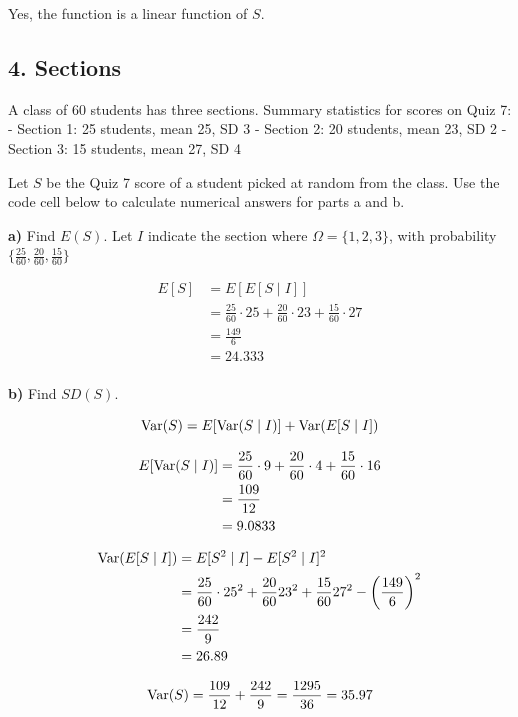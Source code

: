 \documentclass[11pt]{article}
\begin{document}
Yes, the function is a linear function of $S$.
    \newpage

    \hypertarget{sections}{%
\subsection{4. Sections}\label{sections}}

A class of 60 students has three sections. Summary statistics for scores
on Quiz 7: - Section 1: 25 students, mean 25, SD 3 - Section 2: 20
students, mean 23, SD 2 - Section 3: 15 students, mean 27, SD 4

Let \(S\) be the Quiz 7 score of a student picked at random from the
class. Use the code cell below to calculate numerical answers for parts
a and b.

\textbf{a)} Find \(E(S)\).
Let $I$ indicate the section where $\Omega = \{1,2,3\}$, with probability $\{\frac{25}{60}, \frac{20}{60}, \frac{15}{60}\}$ 


\begin{align*}
	E[S] &= E[E[S \mid I]] \\ 
	&= \frac{25}{60} \cdot 25 + \frac{20}{60} \cdot 23 + \frac{15}{60} \cdot 27 \\
	&= \frac{149}{6} \\
	&= 24.333 \\
\end{align*}


\textbf{b)} Find \(SD(S)\).

\[
	\operatorname{Var}(S) = E[\operatorname{Var}(S \mid I)] + \operatorname{Var}(E[S \mid I]) \\
\]

\begin{align*}
	E[\operatorname{Var}(S \mid I)] &= \frac{25}{60} \cdot 9 + \frac{20}{60} \cdot 4 + \frac{15}{60} \cdot 16 \\
	&= \frac{109}{12} \\
	&= 9.0833 \\
\end{align*} 

\begin{align*}
	\operatorname{Var}(E[S \mid I]) &= E[S^{2} \mid I] - E[S^{2} \mid I]^{2} \\
	&= \frac{25}{60} \cdot 25^{2} + \frac{20}{60} 23^{2} + \frac{15}{60} 27^{2} - \left( \frac{149}{6} \right) ^{2} \\
	&= \frac{242}{9} \\
	&= 26.89 \\
\end{align*}

\[
\operatorname{Var}(S) = \frac{109}{12} + \frac{242}{9} = \frac{1295}{36} = 35.97
\]
\end{document}
